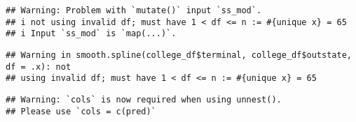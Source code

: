\documentclass[
]{article}
\newenvironment{Shaded}{\begin{snugshade}}{\end{snugshade}}
\newcommand{\DataTypeTok}[1]{\textcolor[rgb]{0.13,0.29,0.53}{#1}}
\newcommand{\DecValTok}[1]{\textcolor[rgb]{0.00,0.00,0.81}{#1}}
\newcommand{\KeywordTok}[1]{\textcolor[rgb]{0.13,0.29,0.53}{\textbf{#1}}}
\newcommand{\NormalTok}[1]{#1}
\newcommand{\OperatorTok}[1]{\textcolor[rgb]{0.81,0.36,0.00}{\textbf{#1}}}
\newcommand{\StringTok}[1]{\textcolor[rgb]{0.31,0.60,0.02}{#1}}
\begin{document}
\begin{Shaded}
\end{Shaded}

\begin{verbatim}
## Warning: Problem with `mutate()` input `ss_mod`.
## i not using invalid df; must have 1 < df <= n := #{unique x} = 65
## i Input `ss_mod` is `map(...)`.
\end{verbatim}

\begin{verbatim}
## Warning in smooth.spline(college_df$terminal, college_df$outstate, df = .x): not
## using invalid df; must have 1 < df <= n := #{unique x} = 65
\end{verbatim}

\begin{verbatim}
## Warning: `cols` is now required when using unnest().
## Please use `cols = c(pred)`
\end{verbatim}
\end{document}
